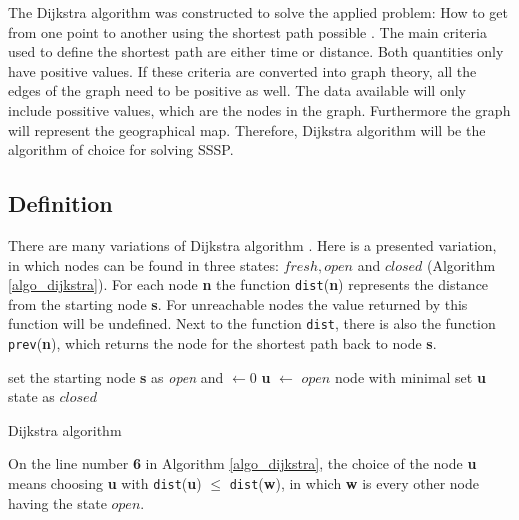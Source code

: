 \documentclass[thesis=M,english]{FITthesis}[2012/10/20]
\begin{document}
The Dijkstra algorithm was constructed to solve the applied problem: How to get from one point to another using the shortest path possible \cite{Frana10}.
The main criteria used to define the shortest path are either time or distance. Both quantities only have positive values. If these criteria are converted into graph theory, all the edges of the graph need to be positive as well.
The data available will only include possitive values, which are the nodes in the graph. Furthermore the graph will represent the geographical map. Therefore, Dijkstra algorithm will be the algorithm of choice for solving SSSP. 

 \subsection{Definition}
There are many variations of Dijkstra algorithm \cite{Mehlhorn08}. Here is a presented variation, in which nodes can be found in three states: $fresh, open $ and $closed$ (Algorithm \ref{algo_dijkstra}). For each node \textbf{n} the function \texttt{dist}(\textbf{n}) represents the distance from the starting node \textbf{s}. For unreachable nodes the value returned by this function will be undefined. Next to the function \texttt{dist}, there is also the function \texttt{prev}(\textbf{n}), which returns the node for the shortest path back to node \textbf{s}.

\begin{algorithm}[H]
 set the starting node \textbf{s} as \textit{open} and $ \leftarrow 0$\;
 {
  \textbf{u} $\leftarrow$ $open$ node with minimal  \;
  set \textbf{u} state as $closed$	\;
  {
  } 
 }
\caption{Dijkstra algorithm}\label{algo_dijkstra}
\end{algorithm}

On the line number \textbf{6} in Algorithm \ref{algo_dijkstra}, the choice of the node \textbf{u} means choosing \textbf{u} with \texttt{dist}(\textbf{u}) $ \leq $ \texttt{dist}(\textbf{w}), in which \textbf{w} is every other node having the state $open$.
\end{document}

